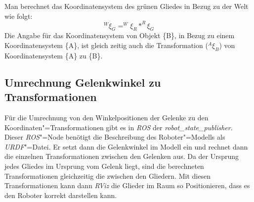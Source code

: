 Man berechnet das Koordinatensystem des grünen Gliedes in Bezug zu der Welt wie folgt:
\begin{equation}
^{W}\xi_{G} = ^{W}\xi_{R} * ^{R}\xi_{G}
\end{equation}
Die Angabe für das Koordinatensystem von Objekt \{B\}, in Bezug zu einem Koordinatensystem \{A\}, ist gleich zeitig auch die Transformation ($^{A}\xi_{B}$) von Koordinatensystem \{A\} zu \{B\}.

\subsection{Umrechnung Gelenkwinkel zu Transformationen}
Für die Umrechnung von den Winkelpositionen der Gelenke zu den Koordinaten"=Transformationen gibt es in \textit{ROS} der \textit{robot\_state\_publisher}.
Dieser \textit{ROS}"=Node benötigt die Beschreibung des Roboter"=Modells als \textit{URDF}"=Datei.
Er setzt dann die Gelenkwinkel im Modell ein und rechnet dann die einzelnen Transformationen zwischen den Gelenken aus.
Da der Ursprung jedes Gliedes im Ursprung vom Gelenk liegt, sind die berechneten Transformationen gleichzeitig die zwischen den Gliedern.
Mit diesen Transformationen kann dann \textit{RViz} die Glieder im Raum so Positionieren, dass es den Roboter korrekt darstellen kann.






